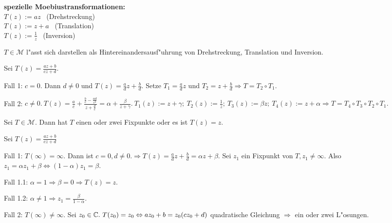 \documentclass[a4paper,twoside,DIV15,BCOR12mm]{scrbook}
\begin{document}
{\bf spezielle Moebiustransformationen:}\\
$T(z) := az$ \ (Drehstreckung)\\
$T(z) := z+a$ \ (Translation)\\
$T(z) := \frac1z$ \ (Inversion)

\begin{satz}
$T \in \mathcal{M}$ l"asst sich darstellen als Hintereinandersausf"uhrung von Drehstreckung, Translation und Inversion.
\end{satz}

\begin{beweis}
Sei $T(z) = \frac{az+b}{cz+d}.$
\begin{liste}
\item[Fall 1:] $c=0$. Dann $d \not= 0$ und $T(z) = \frac{a}{d}z + \frac{b}{d}$. Setze $T_1=\frac{a}{d}z$ und $T_2=z+ \frac{b}{d} \Rightarrow T = T_2 \circ T_1.$
\item[Fall 2:] $c \not= 0.\ T(z) = \frac{a}{c}+\frac{\frac{b}{c}-\frac{ad}{c^2}}{z+\frac{d}{c}} = \alpha + \frac{\beta}{z+ \gamma}.\ T_1(z) := z+ \gamma;\ T_2(z) := \frac1z;\ T_3(z) := \beta z;\ T_4(z):=z + \alpha \Rightarrow T=T_4 \circ T_3 \circ T_2 \circ T_1.$
\end{liste}
\end{beweis}

\begin{satz}
Sei $T \in \mathcal{M}$. Dann hat $T$ einen oder zwei Fixpunkte oder es ist $T(z) = z$.
\end{satz}

\begin{beweis}
Sei $T(z) = \frac{az+b}{cz+d}$
\begin{liste}
\item[Fall 1:] $T(\infty) = \infty.$ Dann ist $c = 0, d \not= 0. \Rightarrow T(z) = \frac{a}{d}z + \frac{b}{d} = \alpha z + \beta.$ Sei $z_1$ ein Fixpunkt von $T, z_1 \not= \infty$. Also $z_1 = \alpha z_1 + \beta \Leftrightarrow (1-\alpha)z_1=\beta.$
\begin{liste}
\item[Fall 1.1:] $\alpha = 1 \Rightarrow \beta = 0 \Rightarrow T(z) = z$.
\item[Fall 1.2:] $\alpha \not=1 \Rightarrow z_1 = \frac{\beta}{1-\alpha}.$
\end{liste}
\item[Fall 2:] $T(\infty) \not= \infty$. Sei $z_0 \in \mathbb{C}.\ T(z_0) = z_0 \Leftrightarrow az_0+b = z_0(cz_0+d)$ quadratische Gleichung $\Rightarrow$ ein oder zwei L"osungen.
\end{liste}
\end{beweis}
\end{document}
